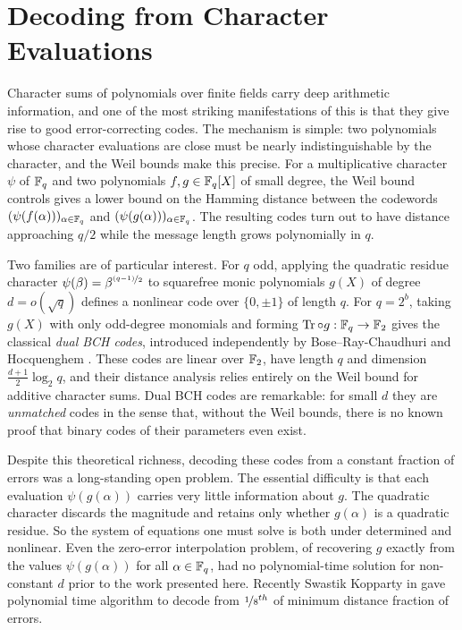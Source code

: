 \chapter{Decoding from Character Evaluations}\label{chap:decoding}
%

Character sums of polynomials over finite fields carry deep arithmetic information, and one of the most striking manifestations of this is that they give rise to good error-correcting codes. The mechanism is simple: two polynomials whose character evaluations are close must be nearly indistinguishable by the character, and the Weil bounds make this precise. For a multiplicative character $\psi$ of $\mathbb{F}_q$ and two polynomials $f, g \in \mathbb{F}_q[X]$ of small degree, the Weil bound controls gives a lower bound on the Hamming distance between the codewords $(\psi(f(\alpha)))_{\alpha \in \mathbb{F}_q}$ and $(\psi(g(\alpha)))_{\alpha \in \mathbb{F}_q}$. The resulting codes turn out to have distance approaching $q/2$ while the message length grows polynomially in $q$.

Two families are of particular interest. For $q$ odd, applying the quadratic residue character $\psi(\beta) = \beta^{\nicefrac{(q-1)}2}$ to squarefree monic polynomials $g(X)$ of degree $d = o(\sqrt{q})$ defines a nonlinear code over $\{0,\pm 1\}$ of length $q$. For $q = 2^b$, taking $g(X)$ with only odd-degree monomials and forming $\operatorname{Tr} \circ g : \mathbb{F}_q \to \mathbb{F}_2$ gives the classical \emph{dual BCH codes}, introduced independently by Bose--Ray-Chaudhuri \cite{Bose1960} and Hocquenghem \cite{Hoc59}. These codes are linear over $\mathbb{F}_2$, have length $q$ and dimension $\frac{d+1}{2}\log_2 q$, and their distance analysis relies entirely on the Weil bound for additive character sums. Dual BCH codes are remarkable: for small $d$ they are \emph{unmatched} codes in the sense that, without the Weil bounds, there is no known proof that binary codes of their parameters even exist.

Despite this theoretical richness, decoding these codes from a constant fraction of errors was a long-standing open problem. The essential difficulty is that each evaluation $\psi(g(\alpha))$ carries very little information about $g$. The quadratic character discards the magnitude and retains only whether $g(\alpha)$ is a quadratic residue. So the system of equations one must solve is both under determined and nonlinear. Even the zero-error interpolation problem, of recovering $g$ exactly from the values $\psi(g(\alpha))$ for all $\alpha \in \mathbb{F}_q$, had no polynomial-time solution for non-constant $d$ prior to the work presented here. Recently Swastik Kopparty in \cite{Kopparty2026} gave polynomial time algorithm to decode from $\nicefrac18^{th}$ of minimum distance fraction of errors. 

